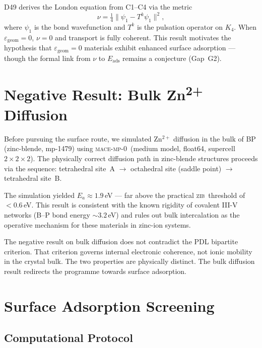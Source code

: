 \documentclass[11pt,a4paper]{article}
\newcommand{\Eads}{E_{\mathrm{ads}}}
\newcommand{\egeom}{\varepsilon_{\mathrm{geom}}}
\newcommand{\MACE}{\textsc{mace-mp-0}}
\newcommand{\ZIB}{\textsc{zib}}
\begin{document}
D49 derives the London equation from C1--C4 via the metric~\cite{D49,D48}
\begin{equation}
\nu = \tfrac{1}{4}\|\psi_1 - T^k\psi_1\|^2,
\end{equation}
where $\psi_1$ is the bond wavefunction and $T^k$ is the pulsation operator on $K_4$. When $\egeom = 0$, $\nu = 0$ and transport is fully coherent. This result motivates the hypothesis that $\egeom = 0$ materials exhibit enhanced surface adsorption — though the formal link from $\nu$ to $\Eads$ remains a conjecture (Gap~G2).

\section{Negative Result: Bulk Zn\texorpdfstring{\textsuperscript{2+}}{2+} Diffusion}
\label{sec:bulk}

Before pursuing the surface route, we simulated Zn$^{2+}$ diffusion in the bulk of BP (zinc-blende, mp-1479) using \MACE\ (medium model, float64, supercell $2\times2\times2$). The physically correct diffusion path in zinc-blende structures proceeds via the sequence: tetrahedral site~A $\to$ octahedral site (saddle point) $\to$ tetrahedral site~B.

The simulation yielded $E_a \approx 1.9$\,eV — far above the practical \ZIB\ threshold of $<0.6$\,eV. This result is consistent with the known rigidity of covalent III-V networks (B--P bond energy $\sim 3.2$\,eV) and rules out bulk intercalation as the operative mechanism for these materials in zinc-ion systems.

\begin{remark}
The negative result on bulk diffusion does not contradict the PDL bipartite criterion. That criterion governs internal electronic coherence, not ionic mobility in the crystal bulk. The two properties are physically distinct. The bulk diffusion result redirects the programme towards surface adsorption.
\end{remark}

\section{Surface Adsorption Screening}
\label{sec:screening}

\subsection{Computational Protocol}
\end{document}
